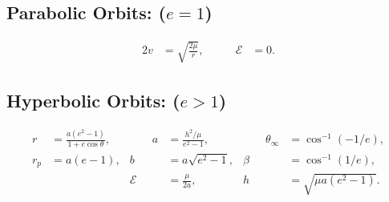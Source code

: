 \documentclass[10pt]{article}
\theoremstyle{plain}\theorembodyfont{\normalfont}
\begin{document}
\subsection*{Parabolic Orbits: ($e=1$)}
\begin{alignat*}{2}
v & = \sqrt{\frac{2\mu}{r}},&\qquad
\mathcal{E} & = 0.
\end{alignat*}

\subsection*{Hyperbolic Orbits: ($e>1$)}

\begin{align*}
r & = \frac{a(e^2-1)}{1+e\cos\theta},&\qquad
a & = \frac{h^2/\mu}{e^2-1},&\qquad
\theta_\infty & = \cos^{-1} (-1/e),\\
r_p & = a(e-1),&
b & = a \sqrt{e^2-1},&
\beta & = \cos^{-1} (1/e),\\
&&
\mathcal{E} & = \frac{\mu}{2a},&
h & = \sqrt{\mu a(e^2-1)}.
\end{align*}
\end{document}
